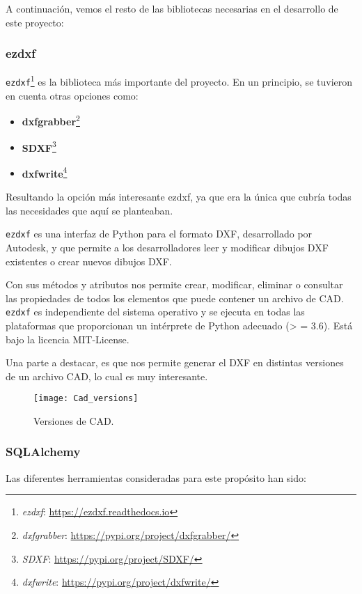 A continuación, vemos el resto de las bibliotecas necesarias en el desarrollo de este proyecto:


\subsubsection{ezdxf}

\texttt{ezdxf}\footnote{\textsl{ezdxf}: \url{ https://ezdxf.readthedocs.io}} es la biblioteca más importante del proyecto. En un principio, se tuvieron en cuenta otras opciones como:
\begin{itemize}
\item \textbf{dxfgrabber}\footnote{\textsl{dxfgrabber}: \url{https://pypi.org/project/dxfgrabber/}}
\item \textbf{SDXF}\footnote{\textsl{SDXF}: \url{https://pypi.org/project/SDXF/}}
\item \textbf{dxfwrite}\footnote{\textsl{dxfwrite}: \url{https://pypi.org/project/dxfwrite/}}
\end{itemize}

Resultando la opción más interesante ezdxf, ya que era la única que cubría todas las necesidades que aquí se planteaban.

\texttt{ezdxf} es una interfaz de Python para el formato DXF, desarrollado por Autodesk, y que permite a los desarrolladores leer y modificar dibujos DXF existentes o crear nuevos dibujos DXF.

Con sus métodos y atributos nos permite crear, modificar, eliminar o consultar las propiedades de todos los elementos que puede contener un archivo de CAD.
\texttt{ezdxf} es independiente del sistema operativo y se ejecuta en todas las plataformas que proporcionan un intérprete de Python adecuado (> = 3.6). Está bajo la licencia MIT-License.

Una parte a destacar, es que nos permite generar el DXF en distintas versiones de un archivo CAD, lo cual es muy interesante. 

\begin{figure}[!h]
	\centering
	\texttt{[image: Cad\_versions]}
	\caption{Versiones de CAD.}
	\label{fig:Cad_versions}
\end{figure}
\subsubsection{SQLAlchemy}
Las diferentes herramientas consideradas para este propósito han sido:

